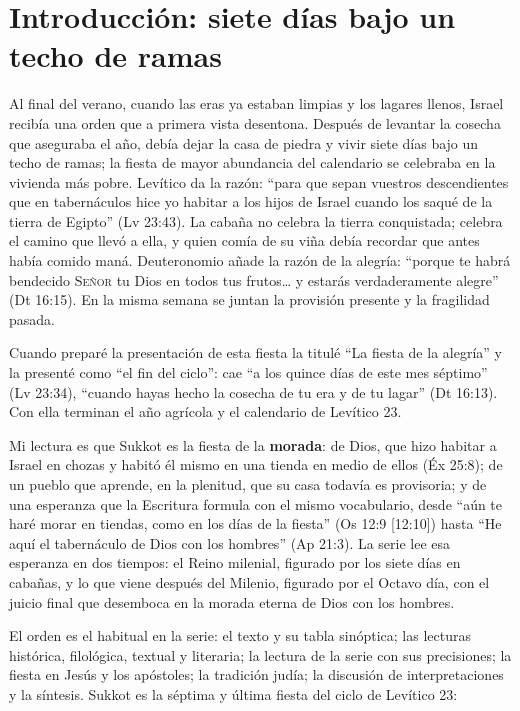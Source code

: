 \documentclass[11pt,letterpaper]{article}
\newcommand{\SENOR}{\textsc{Señor}}
\newcommand{\destacar}[1]{\textbf{\textcolor{tierraroja}{#1}}}
\begin{document}
\section{Introducción: siete días bajo un techo de ramas}

Al final del verano, cuando las eras ya estaban limpias y los lagares llenos, Israel recibía una orden que a primera vista desentona. Después de levantar la cosecha que aseguraba el año, debía dejar la casa de piedra y vivir siete días bajo un techo de ramas; la fiesta de mayor abundancia del calendario se celebraba en la vivienda más pobre. Levítico da la razón: ``para que sepan vuestros descendientes que en tabernáculos hice yo habitar a los hijos de Israel cuando los saqué de la tierra de Egipto'' (Lv 23:43). La cabaña no celebra la tierra conquistada; celebra el camino que llevó a ella, y quien comía de su viña debía recordar que antes había comido maná. Deuteronomio añade la razón de la alegría: ``porque te habrá bendecido \SENOR{} tu Dios en todos tus frutos\ldots{} y estarás verdaderamente alegre'' (Dt 16:15). En la misma semana se juntan la provisión presente y la fragilidad pasada.

Cuando preparé la presentación de esta fiesta la titulé ``La fiesta de la alegría'' y la presenté como ``el fin del ciclo'': cae ``a los quince días de este mes séptimo'' (Lv 23:34), ``cuando hayas hecho la cosecha de tu era y de tu lagar'' (Dt 16:13). Con ella terminan el año agrícola y el calendario de Levítico 23.

Mi lectura es que Sukkot es la fiesta de la \destacar{morada}: de Dios, que hizo habitar a Israel en chozas y habitó él mismo en una tienda en medio de ellos (Éx 25:8); de un pueblo que aprende, en la plenitud, que su casa todavía es provisoria; y de una esperanza que la Escritura formula con el mismo vocabulario, desde ``aún te haré morar en tiendas, como en los días de la fiesta'' (Os 12:9 [12:10]) hasta ``He aquí el tabernáculo de Dios con los hombres'' (Ap 21:3). La serie lee esa esperanza en dos tiempos: el Reino milenial, figurado por los siete días en cabañas, y lo que viene después del Milenio, figurado por el Octavo día, con el juicio final que desemboca en la morada eterna de Dios con los hombres.

El orden es el habitual en la serie: el texto y su tabla sinóptica; las lecturas histórica, filológica, textual y literaria; la lectura de la serie con sus precisiones; la fiesta en Jesús y los apóstoles; la tradición judía; la discusión de interpretaciones y la síntesis. Sukkot es la séptima y última fiesta del ciclo de Levítico 23:
\end{document}

